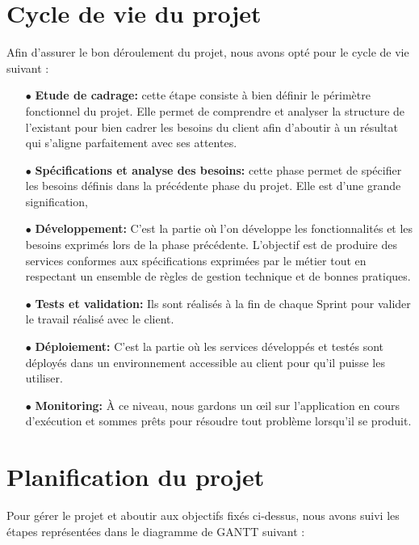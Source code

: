 \section{Cycle de vie du projet}

\par Afin d’assurer le bon déroulement du projet, nous avons opté pour le cycle de vie suivant :
\begin{itemize}
    \item[$\bullet$] \textbf{Etude de cadrage:} cette étape consiste à bien définir le périmètre fonctionnel du projet. Elle permet de comprendre et analyser la structure de l’existant pour bien cadrer les besoins du client afin d’aboutir à un résultat qui s’aligne parfaitement avec ses attentes.
    \item[$\bullet$] \textbf{Spécifications et analyse des besoins:} cette phase permet de spécifier les besoins
définis dans la précédente phase du projet. Elle est d’une grande signification, 
    \item[$\bullet$] \textbf{Développement:} C'est la partie où l'on développe les fonctionnalités et les besoins exprimés lors de la phase précédente. L'objectif est de produire des services conformes aux spécifications exprimées par le métier tout en respectant un ensemble de règles de gestion technique et de bonnes pratiques.
    \item[$\bullet$] \textbf{Tests et validation:} Ils sont réalisés à la fin de chaque Sprint pour valider le travail réalisé avec le client.
    \item[$\bullet$] \textbf{Déploiement:} C'est la partie où les services développés et testés sont déployés dans un environnement accessible au client pour qu'il puisse les utiliser.
    \item[$\bullet$] \textbf{Monitoring:} À ce niveau, nous gardons un œil sur l'application en cours d'exécution et sommes prêts pour résoudre tout problème lorsqu'il se produit. 
\end{itemize}


\section{Planification du projet}
Pour gérer le projet et aboutir aux objectifs fixés ci-dessus, nous avons suivi les étapes représentées dans le diagramme de GANTT suivant :


